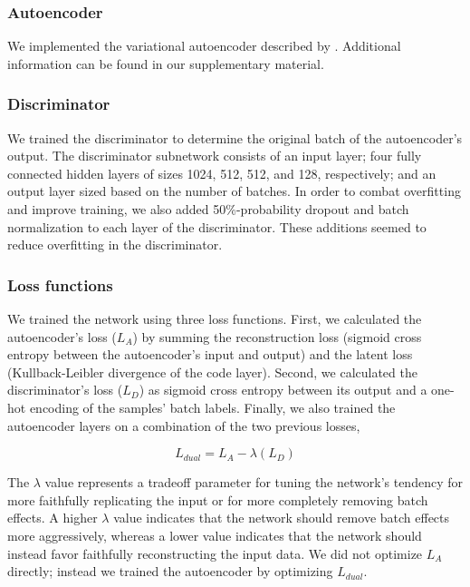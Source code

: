 \documentclass[notitlepage]{article}
\begin{document}
\subsubsection{Autoencoder}

We implemented the variational autoencoder \cite{louizos_variational_2015} described by \citet[Chapter 15]{geron_hands-machine_2017}.
Additional information can be found in our supplementary material.

\subsubsection{Discriminator}

We trained the discriminator to determine the original batch of the autoencoder's output.
The discriminator subnetwork consists of an input layer; four fully connected hidden layers of sizes 1024, 512, 512, and 128, respectively; and an output layer sized based on the number of batches.
In order to combat overfitting and improve training, we also added 50\%-probability dropout \cite{srivastava_dropout_2014} and batch normalization \cite{ioffe_batch_2015} to each layer of the discriminator.
These additions seemed to reduce overfitting in the discriminator.

\subsubsection{Loss functions}

We trained the network using three loss functions.
First, we calculated the autoencoder's loss ($L_A$) by summing the reconstruction loss (sigmoid cross entropy between the autoencoder's input and output) and the latent loss (Kullback-Leibler divergence \cite{kullback_information_1951} of the code layer).
Second, we calculated the discriminator's loss ($L_D$) as sigmoid cross entropy between its output and a one-hot encoding of the samples' batch labels.
Finally, we also trained the autoencoder layers on a combination of the two previous losses,

\begin{equation}
	\label{dual_loss}
	L_{dual} = L_A - \lambda{}(L_D)
\end{equation}

The $\lambda$ value represents a tradeoff parameter for tuning the network's tendency for more faithfully replicating the input or for more completely removing batch effects.
A higher $\lambda$ value indicates that the network should remove batch effects more aggressively, whereas a lower value indicates that the network should instead favor faithfully reconstructing the input data.
We did not optimize $L_A$ directly; instead we trained the autoencoder by optimizing $L_{dual}$.
\end{document}
